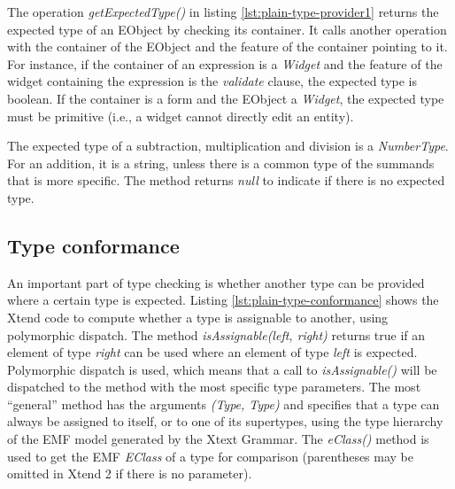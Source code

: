 


The operation \emph{getExpectedType()} in listing \ref{lst:plain-type-provider1}
returns the expected type of an EObject by checking its container. It calls another operation with the container of the EObject and the feature of the container pointing to it. For instance, if the container of an expression is a \emph{Widget} and the feature of the widget containing the expression is the \emph{validate} clause, the expected type is boolean. If the container is a form and the EObject a \emph{Widget}, the expected type must be primitive (i.e., a widget cannot directly edit an entity).

The expected type of a subtraction, multiplication and division is a \emph{NumberType}. For an addition, it is a string, unless there
is a common type of the summands that is more specific. The method returns
\emph{null} to indicate if there is no expected type.

%

\subsection{Type conformance}
An important part of type checking is whether another type can be provided where
a certain type is expected.
Listing \ref{lst:plain-type-conformance} shows the Xtend code to compute whether
a type is assignable to another, using polymorphic dispatch. The method
\emph{isAssignable(left, right)} returns true if an element of
type \emph{right} can be used where an element of type \emph{left} is expected.
Polymorphic dispatch is used, which means that a call to \emph{isAssignable()} will be
dispatched to the method with the most specific type parameters. The most
``general'' method has the arguments \emph{(Type, Type)} and specifies that a type
can always be assigned to itself, or to one of its supertypes, using the type
hierarchy of the EMF model generated by the Xtext Grammar. The \emph{eClass()}
method is used to get the EMF \emph{EClass} of a type for comparison
(parentheses may be omitted in Xtend 2 if there is no parameter).

